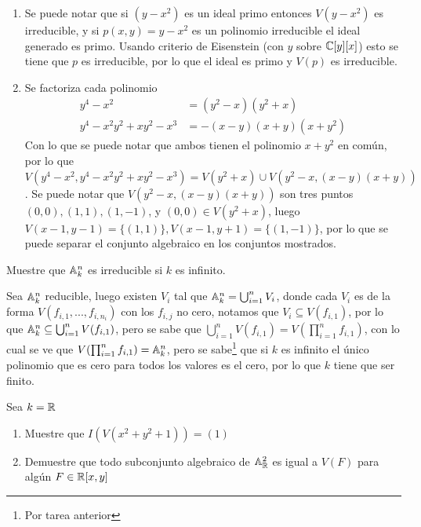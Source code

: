 \begin{sol}{1.25}
    \begin{enumerate}
        \item Se puede notar que si \((y-x^2)\) es un ideal primo entonces \(V(y-x^2)\) es irreducible, y si \(p(x,y)=y-x^2\) es un polinomio irreducible el ideal generado es primo. Usando criterio de Eisenstein (con \(y\) sobre \(\mathbb{C}[y][x]\)) esto se tiene que \(p\) es irreducible, por lo que el ideal es primo y \(V(p)\) es irreducible.
        \item Se factoriza cada polinomio
              \begin{align*}
                  y^4-x^2             & =(y^2-x)(y^2+x)     \\
                  y^4-x^2y^2+xy^2-x^3 & =-(x-y)(x+y)(x+y^2)
              \end{align*}
              Con lo que se puede notar que ambos tienen el polinomio \(x+y^2\) en común, por lo que \(V(y^4-x^2,y^4-x^2y^2+xy^2-x^3)=V(y^2+x)\cup V(y^2-x,(x-y)(x+y))\). Se puede notar que \(V(y^2-x,(x-y)(x+y))\) son tres puntos \((0,0),(1,1),(1,-1)\), y \((0,0)\in V(y^2+x)\), luego \(V(x-1,y-1)=\{(1,1)\},V(x-1,y+1)=\{(1,-1)\}\), por lo que se puede separar el conjunto algebraico en los conjuntos mostrados.
    \end{enumerate}
\end{sol}

\begin{prob}{1.29}
    Muestre que \(\mathbb{A}_k^n\) es irreducible si \(k\) es infinito.
\end{prob}

\begin{sol}{1.29}
    Sea \(\mathbb{A}_k^n\) reducible, luego existen \(V_i\) tal que \(\mathbb{A}_k^n=\bigcup_{i=1}^nV_i\), donde cada \(V_i\) es de la forma \(V(f_{i,1},...,f_{i,n_i})\) con los \(f_{i,j}\) no cero, notamos que \(V_i\subseteq V(f_{i,1})\), por lo que \(\mathbb{A}_k^n\subseteq\bigcup_{i=1}^nV(f_{i,1})\), pero se sabe que \(\bigcup_{i=1}^nV(f_{i,1})=V(\prod_{i=1}^nf_{i,1})\), con lo cual se ve que \(V(\prod_{i=1}^nf_{i,1})=\mathbb{A}_k^n\), pero se sabe\footnote{Por tarea anterior} que si \(k\) es infinito el único polinomio que es cero para todos los valores es el cero, por lo que \(k\) tiene que ser finito.
\end{sol}

\begin{prob}{1.30}
    Sea \(k=\mathbb{R}\)
    \begin{enumerate}
        \item Muestre que \(I(V(x^2+y^2+1))=(1)\)
        \item Demuestre que todo subconjunto algebraico de \(\mathbb{A}_{\mathbb{R}}^2\) es igual a \(V(F)\) para algún \(F\in\mathbb{R}[x,y]\)
    \end{enumerate}
\end{prob}

